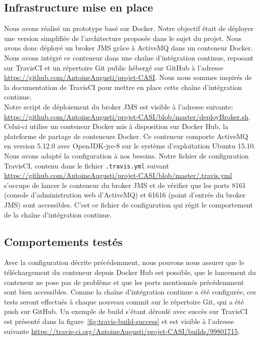 \subsection{Infrastructure mise en place}
    Nous avons réalisé un prototype basé sur Docker. Notre objectif était de déployer une version simplifiée de l'architecture proposée dans le sujet du projet. Nous avons donc déployé un broker JMS grâce à ActiveMQ dans un conteneur Docker. Nous avons intégré ce conteneur dans une chaîne d'intégration continue, reposant sur TravisCI et un répertoire Git public hébergé sur GitHub à l'adresse \url{https://github.com/AntoineAugusti/projet-CASI}. Nous nous sommes inspirés de la documentation de TravisCI pour mettre en place cette chaîne d'intégration continue\cite{travisDocker}.\\

    Notre script de déploiement du broker JMS est visible à l'adresse suivante: \url{https://github.com/AntoineAugusti/projet-CASI/blob/master/deployBroker.sh}. Celui-ci utilise un conteneur Docker mis à disposition sur Docker Hub, la plateforme de partage de conteneurs Docker. Ce conteneur comporte ActiveMQ en version 5.12.0 avec OpenJDK-jre-8 sur le système d'exploitation Ubuntu 15.10. Nous avons adapté la configuration à nos besoins. Notre fichier de configuration TravisCI, contenu dans le fichier \texttt{.travis.yml} suivant \url{https://github.com/AntoineAugusti/projet-CASI/blob/master/.travis.yml} s'occupe de lancer le conteneur du broker JMS et de vérifier que les ports 8161 (console d'administration web d'ActiveMQ) et 61616 (point d'entrée du broker JMS) sont accessibles. C'est ce fichier de configuration qui régit le comportement de la chaîne d'intégration continue.

\subsection{Comportements testés}
    Avec la configuration décrite précédemment, nous pouvons nous assurer que le téléchargement du conteneur depuis Docker Hub est possible, que le lancement du conteneur ne pose pas de problème et que les ports mentionnés précédemment sont bien accessibles. Comme la chaîne d'intégration continue a été configurée, ces tests seront effectués à chaque nouveau commit sur le répertoire Git, qui a été push sur GitHub. Un exemple de build s'étant déroulé avec succès sur TravisCI est présenté dans la figure~\ref{fig:travis-build-success} et est visible à l'adresse suivante \url{https://travis-ci.org/AntoineAugusti/projet-CASI/builds/99801715}.

